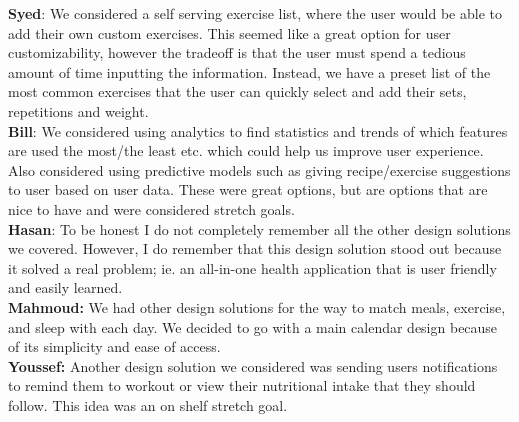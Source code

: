 \documentclass[12pt, titlepage]{article}
\begin{document}
\begin{enumerate}
	\textbf{Syed}: We considered a self serving exercise list, where the user would be able to add their own custom exercises. This seemed like a great option for user customizability, however the tradeoff is that the user must spend a tedious amount of time inputting the information. Instead, we have a preset list of the most common exercises that the user can quickly select and add their sets, repetitions and weight. \\
	\textbf{Bill}: We considered using analytics to find statistics and trends of which features are used the most/the least etc. which could help us improve user experience. Also considered using predictive models such as giving recipe/exercise suggestions to user based on user data. These were great options, but are options that are nice to have and were considered stretch goals. \\
	\textbf{Hasan}: To be honest I do not completely remember all the other design solutions we covered. However, I do remember that this design solution stood out because it solved a real problem; ie. an all-in-one health application that is user friendly and easily learned. \\
	\textbf{Mahmoud:} We had other design solutions for the way to match meals, exercise, and sleep with each day. We decided to go with a main calendar design because of its simplicity and ease of access. \\
	\textbf{Youssef:} Another design solution we considered was sending users notifications to remind them to workout or view their nutritional intake that they should follow. This idea was an on shelf stretch goal.
\end{enumerate}
\end{document}

